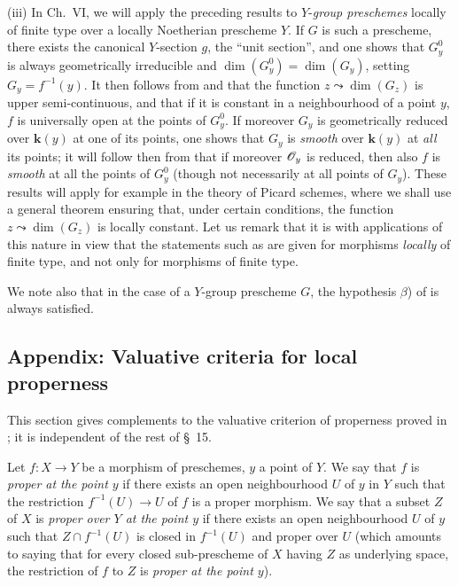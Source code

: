 \begin{remarks}[15.6.10]
(iii)
In Ch.\ VI, we will apply the preceding results to $Y$-\emph{group preschemes} locally of finite type over a locally Noetherian prescheme $Y$.
If $G$ is such a prescheme, there exists the canonical $Y$-section $g$, the ``unit section'', and one shows that $G_y^0$ is always geometrically irreducible and $\dim(G_y^0)=\dim(G_y)$, setting $G_y=f^{-1}(y)$.
It then follows from  and  that the function $z\leadsto\dim(G_z)$ is upper semi-continuous, and that if it is constant in a neighbourhood of a point $y$, $f$ is universally open at the points of $G_y^0$.
If moreover $G_y$ is geometrically reduced over $\boldsymbol{k}(y)$ at one of its points, one shows that $G_y$ is \emph{smooth}  over $\boldsymbol{k}(y)$ at \emph{all} its points; it will follow then from  that if moreover $\mathscr{O}_y$ is reduced, then also $f$ is \emph{smooth} at all the points of $G_y^0$ (though not necessarily at all points of $G_y$).
These results will apply for example in the theory of Picard schemes, where we shall use a general theorem ensuring that, under certain conditions, the function $z\leadsto\dim(G_z)$ is locally constant.
Let us remark that it is with applications of this nature in view that the statements such as  are given for morphisms \emph{locally} of finite type, and not only for morphisms of finite type.

We note also that in the case of a $Y$-group prescheme $G$, the hypothesis $\beta$) of  is always satisfied.
\end{remarks}


\subsection{Appendix: Valuative criteria for local properness}
\label{subsection:IV.15.7}

This section gives complements to the valuative criterion of properness proved in ; it is independent of the rest of \S~15.

\begin{definition}[15.7.1]
\label{IV.15.7.1}
Let $f:X\to Y$ be a morphism of preschemes, $y$ a point of $Y$.
We say that $f$ is \emph{proper at the point $y$} if there exists an open neighbourhood $U$ of $y$ in $Y$ such that the restriction $f^{-1}(U)\to U$ of $f$ is a proper morphism.
We say that a subset $Z$ of $X$ is \emph{proper over $Y$ at the point $y$} if there exists an open neighbourhood $U$ of $y$ such that $Z\cap f^{-1}(U)$ is closed in $f^{-1}(U)$ and proper over $U$  \textup{(which amounts to saying that for every closed sub-prescheme of $X$ having $Z$ as underlying space, the restriction of $f$ to $Z$ is \emph{proper at the point $y$})}.
\end{definition}

